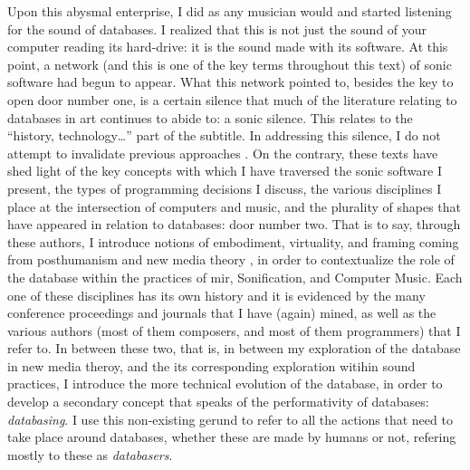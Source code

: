 Upon this abysmal enterprise, I did as any musician would and started listening for the sound of databases. I realized that this is not just the sound of your computer reading its hard-drive: it is the sound made with its software. At this point, a network (and this is one of the key terms throughout this text) of sonic software had begun to appear. What this network pointed to, besides the key to open door number one, is a certain silence that much of the literature relating to databases in art continues to abide to: a sonic silence. This relates to the ``history, technology\dots'' part of the subtitle. In addressing this silence, I do not attempt to invalidate previous approaches \parencites{Man01:The}{Ves07:Dat}. On the contrary, these texts have shed light of the key concepts with which I have traversed the sonic software I present, the types of programming decisions I discuss, the various disciplines I place at the intersection of computers and music, and the plurality of shapes that have appeared in relation to databases: door number two. That is to say, through these authors, I introduce notions of embodiment, virtuality, and framing coming from posthumanism \parencite{Hay99:How} and new media theory \parencite{Han04:New}, in order to contextualize the role of the database within the practices of \gls{mir}, Sonification, and Computer Music. Each one of these disciplines has its own history and it is evidenced by the many conference proceedings and journals that I have (again) mined, as well as the various authors (most of them composers, and most of them programmers) that I refer to. In between these two, that is, in between my exploration of the database in new media theroy, and the its corresponding exploration witihin sound practices, I introduce the more technical evolution of the database, in order to develop a secondary concept that speaks of the performativity of databases: \textit{databasing}. I use this non-existing gerund to refer to all the actions that need to take place around databases, whether these are made by humans or not, refering mostly to these as \textit{databasers}.

